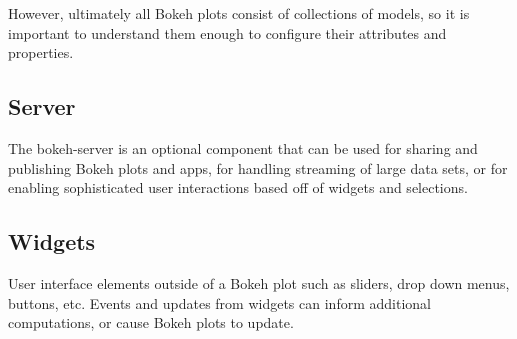 \documentclass[a4paper,12pt]{article}
\begin{document}
However, ultimately all Bokeh plots consist of collections of models, so it is important to understand them enough to configure their attributes and properties. 

\subsection*{Server}
The bokeh-server is an optional component that can be used for sharing and publishing Bokeh plots and apps, for handling streaming of large data sets, or for enabling sophisticated user interactions based off of widgets and selections. 

\subsection*{Widgets}
User interface elements outside of a Bokeh plot such as sliders, drop down menus, buttons, etc. Events and updates from widgets can inform additional computations, or cause Bokeh plots to update.
\end{document}
